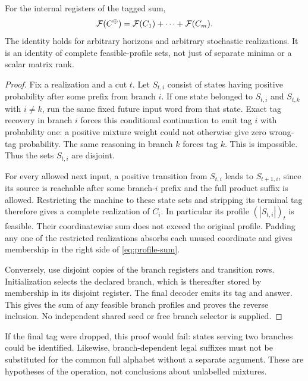 \begin{theorem}
\label{thm:tagged-sum}
For the internal registers of the tagged sum,
\begin{equation}\label{eq:profile-sum}
                   \mathcal F(C^\oplus)=\mathcal F(C_1)+\cdots+\mathcal F(C_m).
\end{equation}
The identity holds for arbitrary horizons and arbitrary stochastic
realizations. It is an identity of complete feasible-profile sets, not
just of separate minima or a scalar matrix rank.
\end{theorem}
\begin{proof}
Fix a realization and a cut $t$. Let $S_{t,i}$ consist of states having
positive probability after some prefix from branch $i$. If one state
belonged to $S_{t,i}$ and $S_{t,k}$ with $i\ne k$, run the same fixed
future input word from that state. Exact tag recovery in branch $i$
forces this conditional continuation to emit tag $i$ with probability
one: a positive mixture weight could not otherwise give zero wrong-tag
probability. The same reasoning in branch $k$ forces tag $k$. This is
impossible. Thus the sets $S_{t,i}$ are disjoint.

For every allowed next input, a positive transition from $S_{t,i}$
leads to $S_{t+1,i}$, since its source is reachable after some branch-$i$
prefix and the full product suffix is allowed. Restricting the machine
to these state sets and stripping its terminal tag therefore gives a
complete realization of $C_i$. In particular its profile
$(|S_{t,i}|)_t$ is feasible. Their coordinatewise sum does not exceed
the original profile. Padding any one of the restricted realizations
absorbs each unused coordinate and gives membership in the right side
of \eqref{eq:profile-sum}.

Conversely, use disjoint copies of the branch registers and transition
rows. Initialization selects the declared branch, which is thereafter
stored by membership in its disjoint register. The final decoder emits
its tag and answer. This gives the sum of any feasible branch profiles
and proves the reverse inclusion. No independent shared seed or free
branch selector is supplied.
\end{proof}

If the final tag were dropped, this proof would fail: states serving two
branches could be identified. Likewise, branch-dependent legal suffixes
must not be substituted for the common full alphabet without a separate
argument. These are hypotheses of the operation, not conclusions about
unlabelled mixtures.

